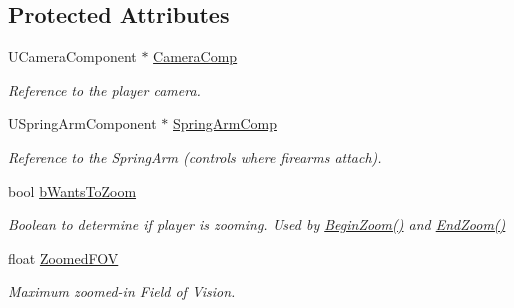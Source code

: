 \subsection*{Protected Attributes}
\begin{DoxyCompactItemize}
\item 
\mbox{\label{class_a_main_character_a83ceb44c34596cf092b3fbdaf6d66649}} 
U\+Camera\+Component $\ast$ \mbox{\hyperlink{class_a_main_character_a83ceb44c34596cf092b3fbdaf6d66649}{Camera\+Comp}}
\begin{DoxyCompactList}\small\item\em Reference to the player camera. \end{DoxyCompactList}\item 
\mbox{\label{class_a_main_character_a149e14225fb4febe5e2dc1d2cdf976fc}} 
U\+Spring\+Arm\+Component $\ast$ \mbox{\hyperlink{class_a_main_character_a149e14225fb4febe5e2dc1d2cdf976fc}{Spring\+Arm\+Comp}}
\begin{DoxyCompactList}\small\item\em Reference to the Spring\+Arm (controls where firearms attach). \end{DoxyCompactList}\item 
\mbox{\label{class_a_main_character_a72af24b99adafa7b9d024732b00957c8}} 
bool \mbox{\hyperlink{class_a_main_character_a72af24b99adafa7b9d024732b00957c8}{b\+Wants\+To\+Zoom}}
\begin{DoxyCompactList}\small\item\em Boolean to determine if player is zooming. Used by \mbox{\hyperlink{class_a_main_character_a4f7eea1e58e20b96564f3408f49737b6}{Begin\+Zoom()}} and \mbox{\hyperlink{class_a_main_character_ab226b5c0e4c8fa348e61f0da84680d3e}{End\+Zoom()}} \end{DoxyCompactList}\item 
\mbox{\label{class_a_main_character_a6be486b784b9900a9217a022be6bcaa2}} 
float \mbox{\hyperlink{class_a_main_character_a6be486b784b9900a9217a022be6bcaa2}{Zoomed\+F\+OV}}
\begin{DoxyCompactList}\small\item\em Maximum zoomed-\/in Field of Vision. \end{DoxyCompactList}\item 
\mbox{\label{class_a_main_character_acb71d1fee43be1c94560bc6f427bdc3f}} 

\end{DoxyCompactItemize}
